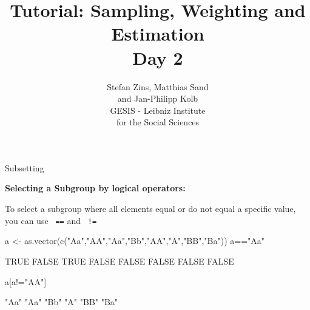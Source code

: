 \documentclass[11pt,german,hideothersubsections]{beamer}
\title[Day 1]{Tutorial: Sampling, Weighting and Estimation\\ \Large{Day 2} }
\author[M. Sand]{Stefan Zins, Matthias Sand\\ and Jan-Philipp Kolb\\ \vspace{.5cm} \footnotesize{GESIS - Leibniz Institute\\ for the Social Sciences}}
\date[]{\color{dunkelgrau}\footnotesize%
\begin{minipage}{8cm}%
\begin{center}%
\scriptsize{
\textbf{GESIS Summer School}\\ \tiny{Cologne, Germany}%
}\\
\vspace{0.25cm}
\textbf{August 25th, 2015}%

\end{center}%
\end{minipage}}%
\newcommand{\R}[1]{{\tt \color{blue}  #1}}
\begin{document}

\maketitle

\begin{frame}[fragile]{Subsetting}
\footnotesize{
\begin{center}
\textbf{\normalsize{Selecting a Subgroup by logical operators:}}\\
\end{center}
\vspace{.25cm}
To select a subgroup where all elements equal or do not equal a specific value, you can use \R{==} and \R{!=}
\vspace{.25cm}
\begin{Schunk}
\begin{Sinput}
 a <- as.vector(c("Aa","AA","Aa","Bb","AA","A","BB","Ba"))
 a=="Aa"
\end{Sinput}
\begin{Soutput}
[1]  TRUE FALSE  TRUE FALSE FALSE FALSE FALSE FALSE
\end{Soutput}
\begin{Sinput}
 a[a!="AA"]
\end{Sinput}
\begin{Soutput}
[1] "Aa" "Aa" "Bb" "A"  "BB" "Ba"
\end{Soutput}
\end{Schunk}
}
\end{frame}
\end{document}

